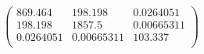 \documentclass{article}
\begin{document}
\[\left(
\begin{array}{ccc}
 869.464 & 198.198 & 0.0264051 \\
 198.198 & 1857.5 & 0.00665311 \\
 0.0264051 & 0.00665311 & 103.337 \\
\end{array}
\right)\]
\end{document}
